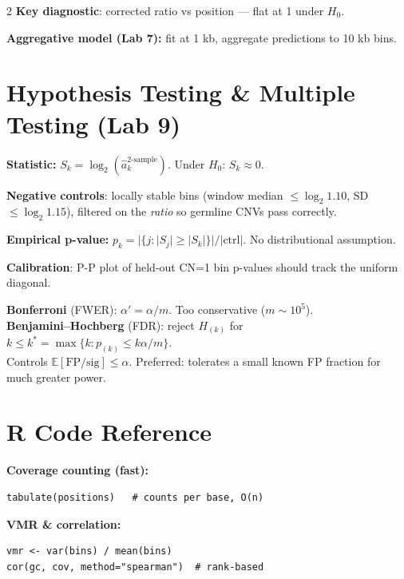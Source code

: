 \documentclass[12pt,a4paper]{article}
\newcommand{\E}{\mathbb{E}}
\begin{document}
\begin{multicols}{2}
\textbf{Key diagnostic}: corrected ratio vs position — flat at 1 under $H_0$.

\textbf{Aggregative model (Lab 7):} fit at 1 kb, aggregate predictions to 10 kb bins.

\section*{Hypothesis Testing \& Multiple Testing (Lab 9)}

\textbf{Statistic:} $S_k = \log_2(\hat a_k^{\text{2-sample}})$. Under $H_0$: $S_k \approx 0$.

\textbf{Negative controls}: locally stable bins (window median $\leq \log_2 1.10$, SD $\leq \log_2 1.15$), filtered on the \emph{ratio} so germline CNVs pass correctly.

\textbf{Empirical p-value:} $p_k = |\{j : |S_j| \geq |S_k|\}|/|\text{ctrl}|$. No distributional assumption.

\textbf{Calibration}: P-P plot of held-out CN=1 bin p-values should track the uniform diagonal.

\textbf{Bonferroni} (FWER): $\alpha'=\alpha/m$. Too conservative ($m\sim10^5$).\\
\textbf{Benjamini--Hochberg} (FDR): reject $H_{(k)}$ for $k \leq k^* = \max\{k: p_{(k)} \leq k\alpha/m\}$.\\
Controls $\E[\text{FP}/\text{sig}]\leq\alpha$. Preferred: tolerates a small known FP fraction for much greater power.

\section*{R Code Reference}

{\setlength{\parskip}{1pt}
\textbf{Coverage counting (fast):}
\begin{lstlisting}
tabulate(positions)   # counts per base, O(n)
\end{lstlisting}

\textbf{VMR \& correlation:}
\begin{lstlisting}
vmr <- var(bins) / mean(bins)
cor(gc, cov, method="spearman")  # rank-based
\end{lstlisting}

}
\end{multicols}
\end{document}
